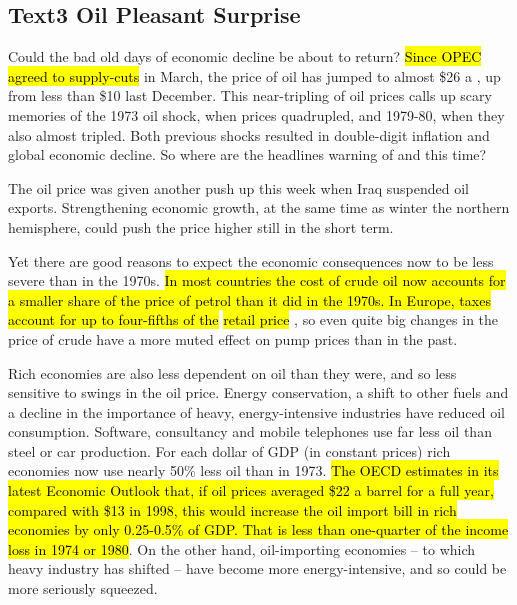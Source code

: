 \subsection{Text3 Oil Pleasant Surprise}
Could the bad old days of economic decline be about to return? 
\hl{Since OPEC agreed to supply-cuts} in March, the price of 
 oil has jumped to almost \$26 a 
, up from less than \$10 last December. This near-tripling of oil prices calls up scary memories of the 1973 oil shock, when prices 
quadrupled, and 1979-80, when they also almost tripled. Both previous shocks resulted in double-digit inflation and global economic decline. So where are the headlines warning of 
 and  this time?

The oil price was given another push up this week when Iraq suspended oil exports. Strengthening economic growth, at the same time as winter 
 the northern 
hemisphere, could push the price higher still in the short term.

Yet there are good reasons to expect the economic consequences now to be less severe than in the 1970s. 
\hl{In most countries the cost of crude oil now accounts for a smaller share of the price of petrol than it did in the 1970s. In Europe, taxes account for up to four-fifths of the} 
\hl{retail price}
, so even quite big changes in the price of crude have a more 
muted effect on 
pump prices than in the past.

Rich economies are also less dependent on oil than they were, and so less sensitive to swings in the oil price. Energy conservation, a shift to other fuels and a decline in the importance of heavy, energy-intensive industries have reduced oil consumption. Software, consultancy and mobile telephones use far less oil than steel or car production. For each dollar of GDP (in constant prices) rich economies now use nearly 50\% less oil than in 1973. 
\hl{The OECD estimates in its latest Economic Outlook that, if oil prices averaged \$22 a barrel for a full year, compared with \$13 in 1998, this would increase the oil import bill in rich economies by only 0.25-0.5\% of GDP. That is less than one-quarter of the income loss in 1974 or 1980}. 
On the other hand, oil-importing 
 economies -- to which heavy industry has shifted -- have become more energy-intensive, and so could be more seriously squeezed.


